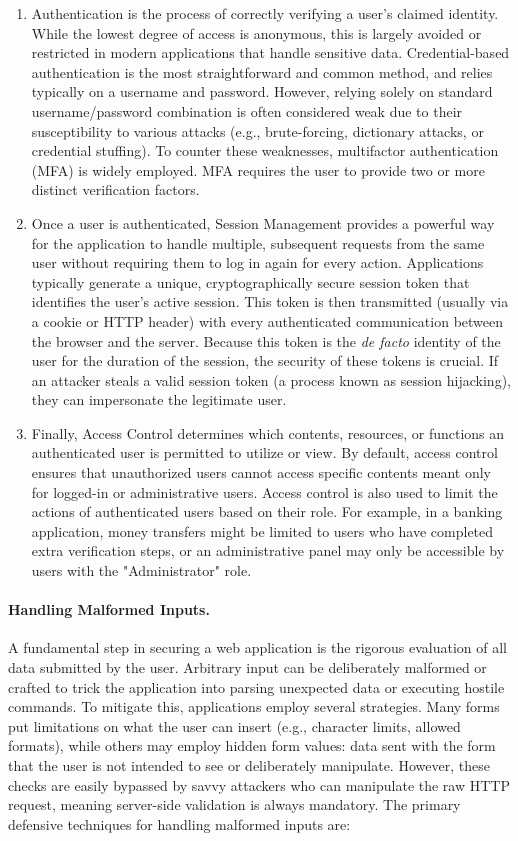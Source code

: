 \begin{enumerate}
    \item Authentication is the process of correctly verifying a user's claimed identity. While the lowest degree of access is anonymous, this is largely avoided or restricted in modern applications that handle sensitive data. Credential-based authentication is the most straightforward and common method, and relies typically on a username and password. However, relying solely on standard username/password combination is often considered weak due to their susceptibility to various attacks (e.g., brute-forcing, dictionary attacks, or credential stuffing). To counter these weaknesses, multifactor authentication (MFA) is widely employed. MFA requires the user to provide two or more distinct verification factors.
    \item Once a user is authenticated, Session Management provides a powerful way for the application to handle multiple, subsequent requests from the same user without requiring them to log in again for every action. Applications typically generate a unique, cryptographically secure session token that identifies the user's active session. This token is then transmitted (usually via a cookie or HTTP header) with every authenticated communication between the browser and the server. Because this token is the \emph{de facto} identity of the user for the duration of the session, the security of these tokens is crucial. If an attacker steals a valid session token (a process known as session hijacking), they can impersonate the legitimate user.
    \item Finally, Access Control determines which contents, resources, or functions an authenticated user is permitted to utilize or view. By default, access control ensures that unauthorized users cannot access specific contents meant only for logged-in or administrative users. Access control is also used to limit the actions of authenticated users based on their role. For example, in a banking application, money transfers might be limited to users who have completed extra verification steps, or an administrative panel may only be accessible by users with the "Administrator" role.
\end{enumerate}

\paragraph{Handling Malformed Inputs.} A fundamental step in securing a web application is the rigorous evaluation of all data submitted by the user. Arbitrary input can be deliberately malformed or crafted to trick the application into parsing unexpected data or executing hostile commands. To mitigate this, applications employ several strategies. Many forms put limitations on what the user can insert (e.g., character limits, allowed formats), while others may employ hidden form values: data sent with the form that the user is not intended to see or deliberately manipulate. However, these checks are easily bypassed by savvy attackers who can manipulate the raw HTTP request, meaning server-side validation is always mandatory. The primary defensive techniques for handling malformed inputs are:

